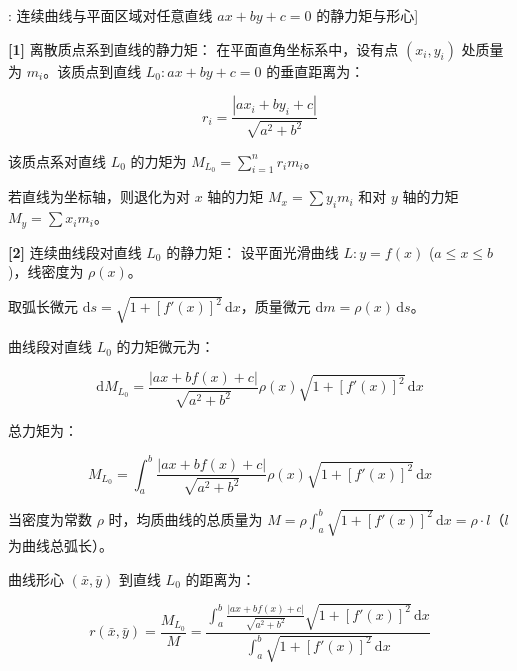 \documentclass[11pt,a4paper,UTF8]{ctexart}
\begin{document}
\begin{thmbox}[公式[1]: 连续曲线与平面区域对任意直线 $ax+by+c=0$ 的静力矩与形心]

\textbf{[1]} 离散质点系到直线的静力矩：
在平面直角坐标系中，设有点 $(x_i, y_i)$ 处质量为 $m_i$。该质点到直线 $L_0: ax + by + c = 0$ 的垂直距离为：


\begin{equation*}
r_i = \frac{|a x_i + b y_i + c|}{\sqrt{a^2 + b^2}}
\end{equation*}


该质点系对直线 $L_0$ 的力矩为 $M_{L_0} = \sum_{i=1}^n r_i m_i$。

若直线为坐标轴，则退化为对 $x$ 轴的力矩 $M_x = \sum y_i m_i$ 和对 $y$ 轴的力矩 $M_y = \sum x_i m_i$。

\textbf{[2]} 连续曲线段对直线 $L_0$ 的静力矩：
设平面光滑曲线 $L: y = f(x)$ ($a \leqslant x \leqslant b$)，线密度为 $\rho(x)$。

取弧长微元 $\mathrm{d}s = \sqrt{1 + [f'(x)]^2}\,\mathrm{d}x$，质量微元 $\mathrm{d}m = \rho(x)\,\mathrm{d}s$。

曲线段对直线 $L_0$ 的力矩微元为：


\begin{equation*}
\mathrm{d}M_{L_0} = \frac{|a x + b f(x) + c|}{\sqrt{a^2 + b^2}} \rho(x) \sqrt{1 + [f'(x)]^2}\,\mathrm{d}x
\end{equation*}


总力矩为：


\begin{equation*}
M_{L_0} = \int_a^b \frac{|a x + b f(x) + c|}{\sqrt{a^2 + b^2}} \rho(x) \sqrt{1 + [f'(x)]^2}\,\mathrm{d}x
\end{equation*}


当密度为常数 $\rho$ 时，均质曲线的总质量为 $M = \rho \int_a^b \sqrt{1 + [f'(x)]^2}\,\mathrm{d}x = \rho \cdot l$（$l$ 为曲线总弧长）。

曲线形心 $(\bar{x}, \bar{y})$ 到直线 $L_0$ 的距离为：


\begin{equation*}
r(\bar{x}, \bar{y}) = \frac{M_{L_0}}{M} = \frac{\int_a^b \frac{|a x + b f(x) + c|}{\sqrt{a^2 + b^2}} \sqrt{1 + [f'(x)]^2}\,\mathrm{d}x}{\int_a^b \sqrt{1 + [f'(x)]^2}\,\mathrm{d}x}
\end{equation*}


\end{thmbox}
\end{document}
